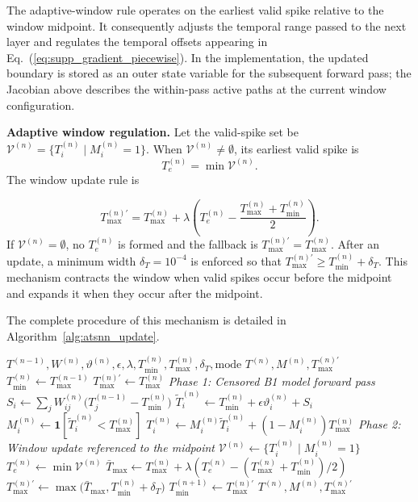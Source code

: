 ﻿\documentclass[12pt]{article}
\begin{document}
The adaptive-window rule operates on the earliest valid spike relative to the window midpoint. It consequently adjusts the temporal range passed to the next layer and regulates the temporal offsets appearing in Eq.~(\ref{eq:supp_gradient_piecewise}). In the implementation, the updated boundary is stored as an outer state variable for the subsequent forward pass; the Jacobian above describes the within-pass active paths at the current window configuration.

\textbf{Adaptive window regulation.}
Let the valid-spike set be $\mathcal{V}^{(n)}=\{T_i^{(n)}\mid M_i^{(n)}=1\}$. When $\mathcal{V}^{(n)}\neq\emptyset$, its earliest valid spike is
\[
T_e^{(n)}=\min \mathcal{V}^{(n)}.
\]
The window update rule is

\begin{equation}
T_{\max}^{(n)\prime} =
T_{\max}^{(n)}
+
\lambda
\left(
T_e^{(n)} -
\frac{T_{\max}^{(n)}+T_{\min}^{(n)}}{2}
\right).
\label{eq:supp_window_update}
\end{equation}
If $\mathcal{V}^{(n)}=\emptyset$, no $T_e^{(n)}$ is formed and the fallback is $T_{\max}^{(n)\prime}=T_{\max}^{(n)}$. After an update, a minimum width $\delta_T=10^{-4}$ is enforced so that $T_{\max}^{(n)\prime}\ge T_{\min}^{(n)}+\delta_T$. This mechanism contracts the window when valid spikes occur before the midpoint and expands it when they occur after the midpoint.

The complete procedure of this mechanism is detailed in Algorithm~\ref{alg:atsnn_update}.

\begin{algorithm}[H]
\caption{Forward pass and adaptive temporal window update.}
\label{alg:atsnn_update}
\begin{algorithmic}[1]
\Require $T^{(n-1)},W^{(n)},\vartheta^{(n)},\epsilon,\lambda,T_{\min}^{(n)},T_{\max}^{(n)},\delta_T,\mathrm{mode}$
\Ensure $T^{(n)},M^{(n)},T_{\max}^{(n)\prime}$
\State $T_{\min}^{(n)}\gets T_{\max}^{(n-1)}$ 
\State $T_{\max}^{(n)\prime}\gets T_{\max}^{(n)}$ 
    \Statex \textit{Phase 1: Censored B1 model forward pass}
    \State $S_i\gets\sum_j W_{ij}^{(n)}\bigl(T_j^{(n-1)}-T_{\min}^{(n)}\bigr)$
    \State $\tilde{T}_i^{(n)}\gets T_{\min}^{(n)}+\epsilon\vartheta_i^{(n)}+S_i$
    \State $M_i^{(n)}\gets\mathbf{1}[\tilde{T}_i^{(n)}<T_{\max}^{(n)}]$
    \State $T_i^{(n)}\gets M_i^{(n)}\tilde{T}_i^{(n)}+(1-M_i^{(n)})T_{\max}^{(n)}$
\EndFor
    \Statex \textit{Phase 2: Window update referenced to the midpoint}
    \State $\mathcal{V}^{(n)}\gets\{T_i^{(n)}\mid M_i^{(n)}=1\}$
        \State $T_e^{(n)}\gets\min\mathcal{V}^{(n)}$
        \State $\bar{T}_{\max}\gets T_{\max}^{(n)}+\lambda\left(T_e^{(n)}-(T_{\max}^{(n)}+T_{\min}^{(n)})/2\right)$
        \State $T_{\max}^{(n)\prime}\gets\max\bigl(\bar{T}_{\max},T_{\min}^{(n)}+\delta_T\bigr)$
    \EndIf
\EndIf
\State $T_{\min}^{(n+1)}\gets T_{\max}^{(n)\prime}$
\State \Return $T^{(n)},M^{(n)},T_{\max}^{(n)\prime}$
\end{algorithmic}
\end{algorithm}
\end{document}
